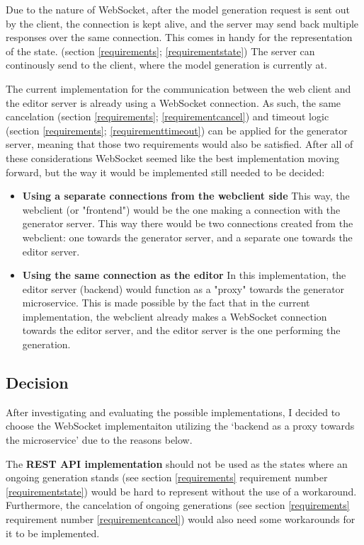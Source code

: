 	Due to the nature of WebSocket, after the model generation request is sent out by the client,
	the connection is kept alive, and the server may send back multiple responses over the same connection.
	This comes in handy for the representation of the state. (section \ref{requirements}; \ref{requirementstate})
	The server can continously send to the client,
	where the model generation is currently at. 

	The current implementation for the communication between the web client and the editor server is already using a WebSocket connection.
	As such, the same cancelation (section \ref{requirements}; \ref{requirementcancel}) and timeout logic (section \ref{requirements}; \ref{requirementtimeout})
	can be applied for the generator server, meaning that those two requirements would also be satisfied.
	After all of these considerations WebSocket seemed like the best implementation moving forward, but the way it would be implemented
	still needed to be decided:

	\begin{itemize}
			\item \textbf{Using a separate connections from the webclient side}
			This way, the webclient (or "frontend") would be the one making a connection with the generator server. This way
			there would be two connections created from the webclient: one towards the generator server, and a separate one 
			towards the editor server.

			\item \textbf{Using the same connection as the editor}
			In this implementation, the editor server (backend) would function as a "proxy" towards the generator microservice. This is made possible 
			by the fact that in the current implementation, the webclient already makes a WebSocket connection towards the editor server, and 
			the editor server is the one performing the generation.
	\end{itemize}

\subsection{Decision} \label{archdecision}
	After investigating and evaluating the possible implementations, I decided to choose the WebSocket implementaiton 
	utilizing the `backend as a proxy towards the microservice' due to the reasons below.

	The \textbf{REST API implementation} should not be used as the states where an ongoing generation stands (see section \ref{requirements} 
	requirement number \ref{requirementstate}) would be hard to represent
	without the use of a workaround. Furthermore, the cancelation of ongoing generations (see section \ref{requirements} 
	requirement number \ref{requirementcancel}) would also need some workarounds for it to be implemented.

